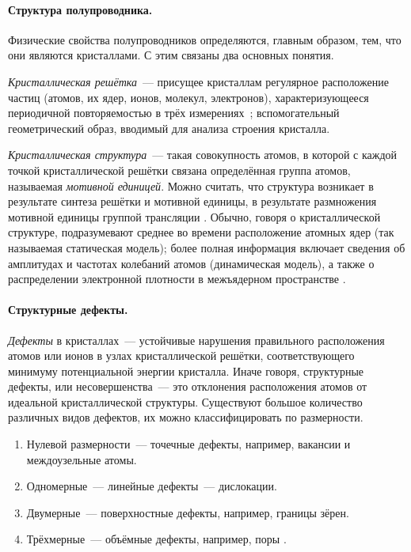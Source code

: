 \documentclass[a4paper, 14pt, titlepage]{extarticle}
\let\term\emph
\newcommand{\term}[1]{\emph{#1}}
\begin{document}
  \paragraph{Структура полупроводника.} Физические свойства полупроводников определяются, главным
  образом, тем, что они являются кристаллами. С этим связаны два основных понятия.

  \term{Кристаллическая решётка}~--- присущее кристаллам регулярное расположение частиц (атомов, их
  ядер, ионов, молекул, электронов), характеризующееся периодичной повторяемостью в трёх
  измерениях~\cite{physenc-crystall}; вспомогательный геометрический образ, вводимый для анализа
  строения кристалла.

  \term{Кристаллическая структура}~--- такая совокупность атомов, в которой с каждой точкой
  кристаллической решётки связана определённая группа атомов, называемая \term{мотивной единицей}. Можно считать,
  что структура возникает в результате синтеза решётки и мотивной единицы, в результате размножения
  мотивной единицы группой трансляции \cite{wiki-cryst-struct}.
  Обычно, говоря о кристаллической структуре, подразумевают среднее во времени расположение атомных
  ядер (так называемая статическая модель); более полная информация включает сведения об амплитудах и частотах
  колебаний атомов (динамическая модель), а также о распределении электронной плотности в межъядерном
  пространстве \cite{chemenc-crystall}.

  \paragraph{Структурные дефекты.} \term{Дефекты} в кристаллах~--- устойчивые нарушения правильного
  расположения атомов или ионов в узлах кристаллической решётки, соответствующего минимуму потенциальной
  энергии кристалла. Иначе говоря, структурные дефекты, или несовершенства~--- это отклонения
  расположения атомов от идеальной кристаллической структуры. Существуют большое количество
  различных видов дефектов, их можно классифицировать по размерности.
  \begin{enumerate}
    \item Нулевой размерности~--- точечные дефекты, например, вакансии и междоузельные атомы.
    \item Одномерные~--- линейные дефекты~--- дислокации.
    \item Двумерные~--- поверхностные дефекты, например, границы зёрен.
    \item Трёхмерные~--- объёмные дефекты, например, поры \cite{matare-defects}.
  \end{enumerate}
\end{document}
